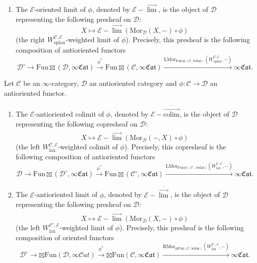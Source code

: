 \documentclass[10pt,oneside]{article}
\numberwithin{equation}{section} %
\numberwithin{figure}{section} %
\theoremstyle{plain}
\theoremstyle{definition}
\newcommand{\mC}{{\mathcal C}}
\newcommand{\mD}{{\mathcal D}}
\newcommand{\mE}{{\mathcal E}}
\renewcommand{\L}{{\mathrm L}}
\newcommand{\R}{{\mathrm R}}
\newcommand{\W}{W}
\newcommand{\colim}{\mathrm{colim}}
\newcommand{\Fun}{\mathrm{Fun}}
\newcommand{\lax}{{\mathrm{lax}}}
\newcommand{\oplax}{{\mathrm{oplax}}}
\newcommand{\Mor}{{\mathrm{Mor}}}
\newcommand{\scat}{\mathcal{C}\mathit{at}}
\begin{document}
\begin{definition}
\begin{definition}
\begin{enumerate}[\normalfont(1)]
\item The $\mE$-oriented limit of $\phi$, denoted by $ \mE-\overset{\to}{\lim} $, is the object of $\mD$ representing the following presheaf on $\mD:$
$$ X \mapsto  \mE-\overset{\to}{\lim}(\mathrm{Mor}_\mD(X,-)\circ \phi)$$
(the right $\W^{\mC,\mE}_\oplax$-weighted limit of $\phi$).
Precisely, this presheaf is the following composition of antioriented functors
$$ \mD^\circ \to {\Fun\boxtimes}(\mD,\infty\mathfrak{Cat}) \xrightarrow{\phi^*} {\Fun\boxtimes}(\mC,\infty\mathfrak{Cat}) \xrightarrow{\L\Mor_{\Fun\boxtimes(\mC,\infty\mathfrak{Cat})}(\W^{\mC,\mE}_\oplax, -)} \infty\mathfrak{Cat}.$$

\end{enumerate}

\end{definition}

\end{definition}

\begin{definition}

Let $\mC$ be an $\infty$-category, $\mD$ an antioriented category  and $\phi: \mC \to \mD$ an antioriented functor. 

\begin{enumerate}[\normalfont(1)]\setlength{\itemsep}{-2pt}

\item The $\mE$-antioriented colimit of $\phi$, denoted by $ \mE-\overset{\bar{\to}}{\colim} $, is the object of $\mD$ representing the following copresheaf on $\mD:$
$$ X \mapsto \mE-\overset{\bar{\to}}{\lim}(\mathrm{Mor}_\mD(-,X)\circ \phi)$$
(the left $\W^{\mC,\mE}_\lax$-weighted colimit of $\phi$).
Precisely, this copresheaf is the following composition of antioriented functors
$$ \mD \to {\Fun\boxtimes}(\mD^\circ,\infty\mathfrak{Cat}) \xrightarrow{\phi^*} {\Fun\boxtimes}(\mC^\circ,\infty\mathfrak{Cat}) \xrightarrow{\L\Mor_{\Fun\boxtimes(\mC^\circ,\infty\mathfrak{Cat})}(\W^{\mC,\mE}_\lax, -)} \infty\mathfrak{Cat}.$$

\item The $\mE$-antioriented limit of $\phi$, denoted by $ \mE-\overset{\bar{\to}}{\lim} $, is the object of $\mD$ representing the following presheaf on $\mD:$
$$ X \mapsto \mE-\overset{\bar{\to}}{\lim}(\mathrm{Mor}_\mD(X,-)\circ \phi)$$
(the left $\W^{\mC^\circ,\mE}_\lax$-weighted limit of $\phi$).
Precisely, this presheaf is the following composition of oriented functors
$$ \mD^\circ \to {\boxtimes\Fun}(\mD,\infty\scat) \xrightarrow{\phi^*} {\boxtimes\Fun}(\mC,\infty\mathfrak{Cat}) \xrightarrow{\R\Mor_{\boxtimes\Fun(\mC,\infty\mathfrak{Cat})}(\W^{\mC^\circ,\mE}_\lax, -)} \infty\mathfrak{Cat}.$$

\end{enumerate}

\end{definition}
\end{document}

